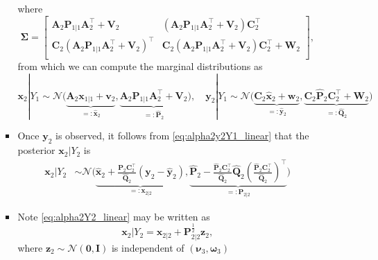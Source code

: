 \documentclass[12pt,a4paper]{article}
\begin{document}
\begin{itemize}
\begin{itemize}
\begin{itemize}
      where
      \begin{equation}\nonumber%
        \bm{\Sigma}
        =
        \begin{bmatrix}
          \bm{A}_{2}\bm{P}_{1|1}\bm{A}_{2}^{\top} + \bm{V}_{2} & (\bm{A}_{2}\bm{P}_{1|1}\bm{A}_{2}^{\top} + \bm{V}_{2})\bm{C}_{2}^{\top}\\
          \bm{C}_{2}(\bm{A}_{2}\bm{P}_{1|1}\bm{A}_{2}^{\top} + \bm{V}_{2})^{\top} & \bm{C}_{2}(\bm{A}_{2}\bm{P}_{1|1}\bm{A}_{2}^{\top} + \bm{V}_{2})\bm{C}_{2}^{\top} + \bm{W}_{2}\\
        \end{bmatrix},
        \nonumber%
      \end{equation}
      from which we can compute the marginal distributions as
      \begin{equation}\nonumber%
        \bm{x}_{2}|Y_{1}
        \sim \mathcal{N} \bigg(
        \underbrace{\bm{A}_{2}\bm{x}_{1|1} + \bm{v}_{2}}_{=:\hat{\bm{x}}_{2}},
        \underbrace{\bm{A}_{2}\bm{P}_{1|1}\bm{A}_{2}^{\top} + \bm{V}_{2}}_{=:\hat{\bm{P}}_{2}}
        \bigg),
        \quad
        \bm{y}_{2}|Y_{1}
        \sim \mathcal{N} \bigg(
        \underbrace{\bm{C}_{2}\hat{\bm{x}}_{2} + \bm{w}_{2}}_{=:\hat{\bm{y}}_{2}},
        \underbrace{\bm{C}_{2}\hat{\bm{P}}_{2}\bm{C}_{2}^{\top}+\bm{W}_{2}}_{=:\hat{\bm{Q}}_{2}}
        \bigg)
      \end{equation}

    \item Once $\bm{y}_{2}$ is observed, it follows from \eqref{eq:alpha2y2Y1_linear}
      that the posterior $\bm{x}_{2}|Y_{2}$ is
      \begin{align}
        \bm{x}_{2}|Y_{2}
        & \sim
          \mathcal{N} \bigg(
          \underbrace{\hat{\bm{x}}_{2} + \frac{\hat{\bm{P}}_{2}\bm{C}_{2}^{\top}}{\hat{\bm{Q}}_{2}}(\bm{y}_{2}-\hat{\bm{y}}_{2})}_{=:\bm{x}_{2|2}},
          \underbrace{\hat{\bm{P}}_{2} - \frac{\hat{\bm{P}}_{2}\bm{C}_{2}^{\top}}{\hat{\bm{Q}}_{2}}\hat{\bm{Q}}_{2}\left(\frac{\hat{\bm{P}}_{2}\bm{C}_{2}^{\top}}{\hat{\bm{Q}}_{2}}\right)^{\top}}_{=:\bm{P}_{2|2}}
          \bigg)
          \label{eq:alpha2Y2_linear}%
      \end{align}

    \item Note \eqref{eq:alpha2Y2_linear} may be written as
      \begin{equation}\label{eq:alpha2Y2z_linear}%
        \bm{x}_{2}|Y_{2} = \bm{x}_{2|2} + \bm{P}_{2|2}^{\frac{1}{2}}\bm{z}_{2},
      \end{equation}
      where $\bm{z}_{2}\sim \mathcal{N}(\bm{0},\bm{I})$ is independent of
      $(\bm{\nu}_{3},\bm{\omega}_{3})$


\end{itemize}
\end{itemize}
\end{itemize}
\end{document}
